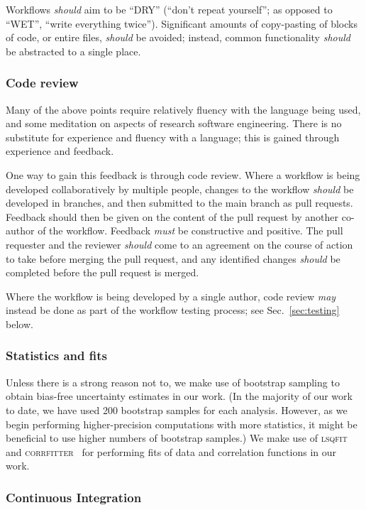 \documentclass{article}
\newcommand\rfcword[1]{\emph{#1}\xspace}
\newcommand\must{\rfcword{must}}
\newcommand\should{\rfcword{should}}
\newcommand\may{\rfcword{may}}
\newcommand\program[1]{\textsc{#1}\xspace}
\begin{document}
Workflows \should aim to be ``DRY''
(``don't repeat yourself'';
as opposed to ``WET'',
``write everything twice'').
Significant amounts of copy-pasting of blocks of code,
or entire files,
\should be avoided;
instead,
common functionality \should be abstracted to a single place.


\subsubsection{Code review}\label{sec:code-review}

Many of the above points require relatively fluency with the language being used,
and some meditation on aspects of research software engineering.
There is no substitute for experience and fluency with a language;
this is gained through experience and feedback.

One way to gain this feedback is through code review.
Where a workflow is being developed collaboratively by multiple people,
changes to the workflow \should be developed in branches,
and then submitted to the main branch as pull requests.
Feedback should then be given on the content of the pull request
by another co-author of the workflow.
Feedback \must be constructive and positive.
The pull requester and the reviewer \should come to an agreement on
the course of action to take before merging the pull request,
and any identified changes \should be completed before the pull request is merged.

Where the workflow is being developed by a single author,
code review \may instead be done as part of the workflow testing process;
see Sec.~\ref{sec:testing} below.

\subsubsection{Statistics and fits}

Unless there is a strong reason not to,
we make use of bootstrap sampling
to obtain bias-free uncertainty estimates in our work.
(In the majority of our work to date,
we have used 200 bootstrap samples for each analysis.
However,
as we begin performing higher-precision computations with more statistics,
it might be beneficial to use higher numbers of bootstrap samples.)
We make use of
\program{lsqfit}~\cite{lsqfit,peter_lepage_2024_12690493}
and \program{corrfitter}~\cite{corrfitter,peter_lepage_2021_5733391}
for performing fits of data and correlation functions in our work.

\subsubsection{Continuous Integration}
\end{document}
